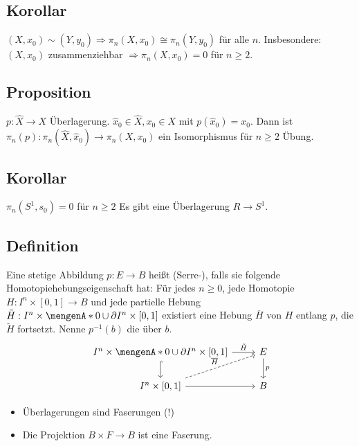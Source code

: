 \subsection{Korollar} %
\label{sub:147}
$(X,x_0) \sim (Y,y_0) \Rightarrow \pi_n(X,x_0) \cong \pi_n(Y,y_0)$ für alle $n$. Insbesondere: $(X,x_0)$ zusammenziehbar $\Rightarrow \pi_n(X,x_0) = 0$ für $n \ge 2$.

\subsection{Proposition} %
\label{sub:148}
$p : \hat{X} \to X$ Überlagerung. $\hat{x}_0 \in \hat{X}, x_0 \in X$ mit $p(\hat{x}_0) = x_0$. Dann ist $\pi_n(p) : \pi_n(\hat{X}, \hat{x}_0) \to \pi_n(X,x_0)$ ein
Isomorphismus für $n \ge 2$
Übung.

\subsection{Korollar} %
\label{sub:149}
$\pi_n(S^1, s_0) = 0$ für $n \ge 2$
Es gibt eine Überlagerung $R \to S^1$. \bewende

\subsection[Definition: Faserung]{Definition} %
\label{sub:1410}
Eine stetige Abbildung $p : E \to B$ heißt (Serre-), falls sie folgende Homotopiehebungseigenschaft hat: Für jedes $n \ge 0$, jede Homotopie 
$H : I^n \times [0,1] \to B$ und jede partielle Hebung $\tilde{H} : I^n \times \set{0} \cup \partial I^n \times [0,1]$ existiert eine Hebung $\overline{H}$ von $H$
entlang $p$, die $\tilde{H}$ fortsetzt. Nenne $p ^{-1}(b)$ die  über $b$. 
\[
	\begin{tikzcd}
		I^n \times \set{0} \cup \partial I^n \times [0,1] \rar["\tilde{H}"]  \dar[hook]& E \dar["p"] \\
		I^n \times [0,1] \rar \urar[dashed, "\overline{H} "]& B
	\end{tikzcd}
\]
\begin{itemize}
	\item Überlagerungen sind Faserungen (!)
	\item Die Projektion $B \times F \to B$ ist eine Faserung.
\end{itemize}

